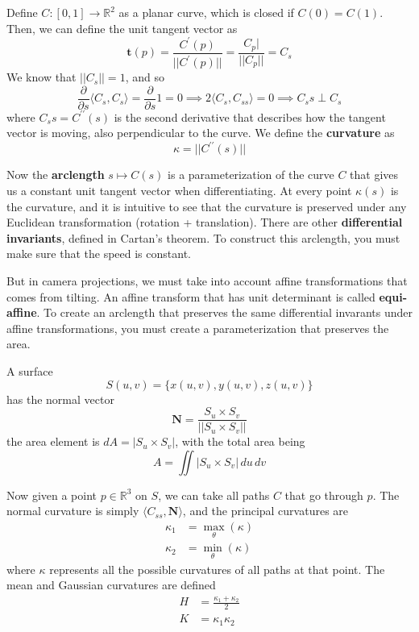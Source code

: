 \documentclass{article}
\begin{document}
    \begin{definition}
    Define $C: [0, 1] \rightarrow \mathbb{R}^2$ as a planar curve, which is closed if $C(0) = C(1)$. Then, we can define the unit tangent vector as 
    \[\mathbf{t}(p) = \frac{C^\prime (p)}{|| C^\prime (p)||} = \frac{C_p|}{||C_p||} = C_s\]
    We know that $||C_s|| = 1$, and so 
    \[\frac{\partial}{\partial s} \langle C_s, C_s \rangle = \frac{\partial}{\partial s} 1 = 0 \implies 2 \langle C_s, C_{ss} \rangle = 0 \implies C_ss \perp C_s\]
    where $C_ss = C^{\prime\prime} (s)$ is the second derivative that describes how the tangent vector is moving, also perpendicular to the curve. We define the \textbf{curvature} as
    \[\kappa = ||C^{\prime\prime} (s) ||\]
    \end{definition}

    Now the \textbf{arclength} $s \mapsto C(s)$ is a parameterization of the curve $C$ that gives us a constant unit tangent vector when differentiating. At every point $\kappa(s)$ is the curvature, and it is intuitive to see that the curvature is preserved under any Euclidean transformation (rotation + translation). There are other \textbf{differential invariants}, defined in Cartan's theorem. To construct this arclength, you must make sure that the speed is constant. 

    But in camera projections, we must take into account affine transformations that comes from tilting. An affine transform that has unit determinant is called \textbf{equi-affine}. To create an arclength that preserves the same differential invarants under affine transformations, you must create a parameterization that preserves the area. 


    \begin{definition}[Surface]
    A surface 
    \[S(u, v) = \{x(u, v), y(u, v), z(u, v)\}\]
    has the normal vector 
    \[\mathbf{N} = \frac{S_u \times S_v}{||S_u \times S_v||}\]
    the area element is $dA = |S_u \times S_v|$, with the total area being 
    \[A = \iint |S_u \times S_v| \, du\,dv \]
    \end{definition}

    Now given a point $p \in \mathbb{R}^3$ on $S$, we can take all paths $C$ that go through $p$. The normal curvature is simply $\langle C_{ss} , \mathbf{N}\rangle$, and the principal curvatures are 
    \begin{align*}
        \kappa_1 & = \max_\theta (\kappa) \\
        \kappa_2 & = \min_\theta (\kappa) 
    \end{align*}
    where $\kappa$ represents all the possible curvatures of all paths at that point. The mean and Gaussian curvatures are defined 
    \begin{align*}
        H & = \frac{\kappa_1 + \kappa_2}{2} \\
        K & = \kappa_1 \kappa_2
    \end{align*}
\end{document}
